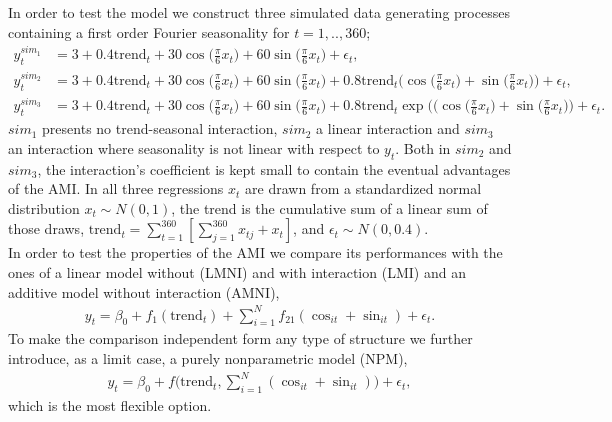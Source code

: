 \documentclass{article}\usepackage[]{graphicx}\usepackage[]{color}
\begin{document}
In order to test the model we construct three simulated data generating processes containing a first order Fourier seasonality for $t=1,..,360$; 
\begin{align*}%
y_{t}^{sim_{1}} &= 3 + 0.4 \text{trend}_{t} + 30 \cos\bigg(\frac{\pi}{6}x_{t}\bigg) + 60 \sin\bigg(\frac{\pi}{6}x_{t}\bigg) + \epsilon_{t}, \\
y_{t}^{sim_{2}} &= 3 + 0.4 \text{trend}_{t} + 30 \cos\bigg(\frac{\pi}{6}x_{t}\bigg) + 60 \sin\bigg(\frac{\pi}{6}x_{t}\bigg) + 0.8 \text{trend}_{t} \bigg(\cos\bigg(\frac{\pi}{6}x_{t}\bigg) + \sin\bigg(\frac{\pi}{6}x_{t}\bigg) \bigg) + \epsilon_{t}, \\
y_{t}^{sim_{3}} &= 3 + 0.4 \text{trend}_{t} + 30 \cos\bigg(\frac{\pi}{6}x_{t}\bigg) + 60 \sin\bigg(\frac{\pi}{6}x_{t}\bigg) + 0.8 \text{trend}_{t} \exp\bigg(\bigg(\cos\bigg(\frac{\pi}{6}x_{t}\bigg) + \sin\bigg(\frac{\pi}{6}x_{t}\bigg) \bigg) + \epsilon_{t}.
\end{align*}
$ sim_{1} $ presents no trend-seasonal interaction, $ sim_{2} $ a linear interaction and $ sim_{3} $ an interaction where seasonality is not linear with respect to $y_t$. Both in $sim_2$ and $sim_3$, the interaction's coefficient is kept small to contain the eventual advantages of the AMI. In all three regressions $ x_{t} $ are drawn from a standardized normal distribution $ x_{t} \sim N(0,1) $, the trend is the cumulative sum of a linear sum of those draws, $ \text{trend}_{t} = \sum_{t=1}^{360} [\sum_{j=1}^{360} x_{tj} + x_{t}]  $, and $ \epsilon_{t} \sim N(0, 0.4) $. \\
In order to test the properties of the AMI we compare its performances with the ones of a linear model without (LMNI) and with interaction (LMI) and an additive model without interaction (AMNI),
\begin{align}\label{fourier_am_no_int}
y_{t} = \beta_{0} + f_{1}(\text{trend}_{t}) + \sum_{i=1}^{N} f_{21} (\cos_{it} + \sin_{it}) + \epsilon_{t}.
\end{align}
To make the comparison independent form any type of structure we further introduce, as a limit case, a purely nonparametric model (NPM), 
\begin{align}\label{fourier_non_par}
y_{t} = \beta_{0} + f\bigg(\text{trend}_t, \sum_{i=1}^{N} (\cos_{it} + \sin_{it}) \bigg) + \epsilon_{t},
\end{align}
which is the most flexible option. 
\end{document}
